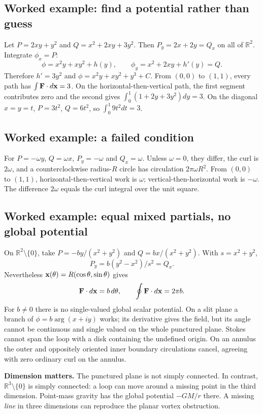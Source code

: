 \documentclass[11pt]{article}
\begin{document}
\subsection{Worked example: find a potential rather than guess}
Let $P=2xy+y^2$ and $Q=x^2+2xy+3y^2$. Then $P_y=2x+2y=Q_x$ on all of $\mathbb R^2$. Integrate $\phi_x=P$:
\[\phi=x^2y+xy^2+h(y),\qquad \phi_y=x^2+2xy+h'(y)=Q.\]
Therefore $h'=3y^2$ and $\phi=x^2y+xy^2+y^3+C$. From $(0,0)$ to $(1,1)$, every path has $\int\mathbf F\cdot d\mathbf x=3$. On the horizontal-then-vertical path, the first segment contributes zero and the second gives $\int_0^1(1+2y+3y^2)dy=3$. On the diagonal $x=y=t$, $P=3t^2$, $Q=6t^2$, so $\int_0^1 9t^2dt=3$.

\subsection{Worked example: a failed condition}
For $P=-\omega y$, $Q=\omega x$, $P_y=-\omega$ and $Q_x=\omega$. Unless $\omega=0$, they differ, the curl is $2\omega$, and a counterclockwise radius-$R$ circle has circulation $2\pi\omega R^2$. From $(0,0)$ to $(1,1)$, horizontal-then-vertical work is $\omega$; vertical-then-horizontal work is $-\omega$. The difference $2\omega$ equals the curl integral over the unit square.

\subsection{Worked example: equal mixed partials, no global potential}
On $\mathbb R^2\setminus\{0\}$, take $P=-by/(x^2+y^2)$ and $Q=bx/(x^2+y^2)$. With $s=x^2+y^2$,
\[P_y=b(y^2-x^2)/s^2=Q_x.\]
Nevertheless $\mathbf x(\theta)=R(\cos\theta,\sin\theta)$ gives
\[\mathbf F\cdot d\mathbf x=b\,d\theta,\qquad\oint\mathbf F\cdot d\mathbf x=2\pi b.\]
For $b\ne0$ there is no single-valued global scalar potential. On a slit plane a branch of $\phi=b\arg(x+iy)$ works; its derivative gives the field, but its angle cannot be continuous and single valued on the whole punctured plane. Stokes cannot span the loop with a disk containing the undefined origin. On an annulus the outer and oppositely oriented inner boundary circulations cancel, agreeing with zero ordinary curl on the annulus.

\textbf{Dimension matters.} The punctured plane is not simply connected. In contrast, $\mathbb R^3\setminus\{0\}$ is simply connected: a loop can move around a missing point in the third dimension. Point-mass gravity has the global potential $-GM/r$ there. A missing \emph{line} in three dimensions can reproduce the planar vortex obstruction.
\end{document}
